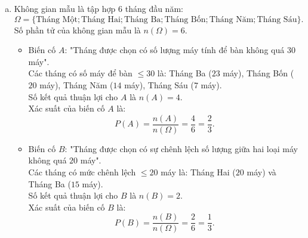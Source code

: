 \begin{bt}
{\begin{enumerate}[a)]
\begin{itemize}
		\end{itemize}
		So sánh các kết quả trên, ta thấy $15 < 20 < 29 < 30 < 50 < 52$.\\
		Vậy tháng Ba có sự chênh lệch giữa số lượng hai loại máy bán ra là ít nhất ($15$ máy).
		\item Không gian mẫu là tập hợp $6$ tháng đầu năm:
		$$\Omega = \{\text{Tháng Một}; \text{Tháng Hai}; \text{Tháng Ba}; \text{Tháng Bốn}; \text{Tháng Năm}; \text{Tháng Sáu}\}.$$
		Số phần tử của không gian mẫu là $n(\Omega) = 6$.
		\begin{itemize}
			\item Biến cố $A$: "Tháng được chọn có số lượng máy tính để bàn không quá $30$ máy".\\
			Các tháng có số máy để bàn $\le 30$ là: Tháng Ba ($23$ máy), Tháng Bốn ($20$ máy), Tháng Năm ($14$ máy), Tháng Sáu ($7$ máy).\\
			Số kết quả thuận lợi cho $A$ là $n(A) = 4$.\\
			Xác suất của biến cố $A$ là:
			$$P(A) = \frac{n(A)}{n(\Omega)} = \frac{4}{6} = \frac{2}{3}.$$
			\item Biến cố $B$: "Tháng được chọn có sự chênh lệch số lượng giữa hai loại máy không quá $20$ máy".\\
			Các tháng có mức chênh lệch $\le 20$ máy là: Tháng Hai ($20$ máy) và Tháng Ba ($15$ máy).\\
			Số kết quả thuận lợi cho $B$ là $n(B) = 2$.\\
			Xác suất của biến cố $B$ là:
			$$P(B) = \frac{n(B)}{n(\Omega)} = \frac{2}{6} = \frac{1}{3}.$$
		\end{itemize}
	\end{enumerate}
}
\end{bt}

